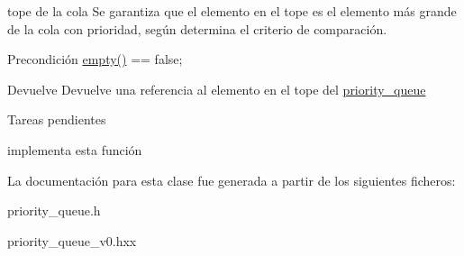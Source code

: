 tope de la cola \-Se garantiza que el elemento en el tope es el elemento más grande de la cola con prioridad, según determina el criterio de comparación. 

\begin{DoxyPrecond}{\-Precondición}
\hyperlink{classpriority__queue_a48a3f0d42865aca9ccba2309548546ad}{empty()} == false; 
\end{DoxyPrecond}
\begin{DoxyReturn}{\-Devuelve}
\-Devuelve una referencia al elemento en el tope del \hyperlink{classpriority__queue}{priority\-\_\-queue}
\end{DoxyReturn}
\begin{DoxyRefDesc}{\-Tareas pendientes}
\item[\hyperlink{todo__todo000006}{\-Tareas pendientes}]implementa esta función \end{DoxyRefDesc}


\-La documentación para esta clase fue generada a partir de los siguientes ficheros\-:\begin{DoxyCompactItemize}
\item 
priority\-\_\-queue.\-h\item 
priority\-\_\-queue\-\_\-v0.\-hxx\end{DoxyCompactItemize}
